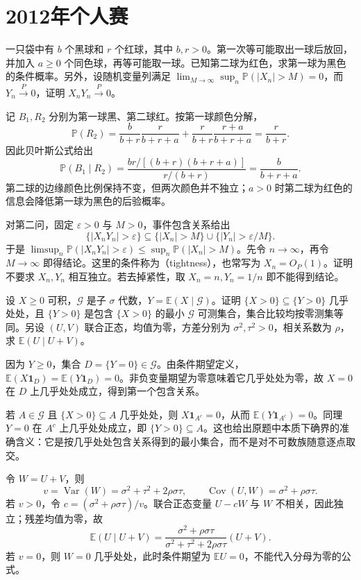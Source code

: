 \documentclass[UTF8,12pt,a4paper,fontset=fandol]{ctexbook}
\newcommand{\E}{\mathbb E}
\newcommand{\PP}{\mathbb P}
\DeclareMathOperator{\Var}{Var}
\DeclareMathOperator{\Cov}{Cov}
\begin{document}
\section{2012年个人赛}
\begin{example}[原题1：强化抽样与随机乘积]\label{yau:2012-1}
一只袋中有 $b$ 个黑球和 $r$ 个红球，其中 $b,r>0$。第一次等可能取出一球后放回，并加入 $a\ge0$ 个同色球，再等可能取一球。已知第二球为红色，求第一球为黑色的条件概率。另外，设随机变量列满足 $\lim_{M\to\infty}\sup_n\PP(|X_n|>M)=0$，而 $Y_n\xrightarrow{P}0$，证明 $X_nY_n\xrightarrow{P}0$。
\end{example}
\begin{solve}
记 $B_1,R_2$ 分别为第一球黑、第二球红。按第一球颜色分解，
\[
\PP(R_2)=\frac b{b+r}\frac r{b+r+a}+\frac r{b+r}\frac{r+a}{b+r+a}=\frac r{b+r}.
\]
因此贝叶斯公式给出
\[
\PP(B_1\mid R_2)=\frac{br/[(b+r)(b+r+a)]}{r/(b+r)}=\frac b{b+r+a}.
\]
第二球的边缘颜色比例保持不变，但两次颜色并不独立；$a>0$ 时第二球为红色的信息会降低第一球为黑色的后验概率。

对第二问，固定 $\varepsilon>0$ 与 $M>0$，事件包含关系给出
\[
\{|X_nY_n|>\varepsilon\}\subseteq\{|X_n|>M\}\cup\{|Y_n|>\varepsilon/M\}.
\]
于是 $\limsup_n\PP(|X_nY_n|>\varepsilon)\le\sup_n\PP(|X_n|>M)$。先令 $n\to\infty$，再令 $M\to\infty$ 即得结论。这里的条件称为（tightness），也常写为 $X_n=O_P(1)$。证明不要求 $X_n,Y_n$ 相互独立。若去掉紧性，取 $X_n=n,Y_n=1/n$ 即不能得到结论。
\end{solve}

\begin{example}[原题2：条件期望的正值集合与正态投影]\label{yau:2012-2}
设 $X\ge0$ 可积，$\mathcal G$ 是子 $\sigma$ 代数，$Y=\E(X\mid\mathcal G)$。证明 $\{X>0\}\subseteq\{Y>0\}$ 几乎处处，且 $\{Y>0\}$ 是包含 $\{X>0\}$ 的最小 $\mathcal G$ 可测集合，集合比较均按零测集等同。另设 $(U,V)$ 联合正态，均值为零，方差分别为 $\sigma^2,\tau^2>0$，相关系数为 $\rho$，求 $\E(U\mid U+V)$。
\end{example}
\begin{solve}
因为 $Y\ge0$，集合 $D=\{Y=0\}\in\mathcal G$。由条件期望定义，$\E(X\mathbf1_D)=\E(Y\mathbf1_D)=0$。非负变量期望为零意味着它几乎处处为零，故 $X=0$ 在 $D$ 上几乎处处成立，得到第一个包含关系。

若 $A\in\mathcal G$ 且 $\{X>0\}\subseteq A$ 几乎处处，则 $X\mathbf1_{A^c}=0$，从而 $\E(Y\mathbf1_{A^c})=0$。同理 $Y=0$ 在 $A^c$ 上几乎处处成立，即 $\{Y>0\}\subseteq A$。这也给出原题中本质下确界的准确含义：它是按几乎处处包含关系得到的最小集合，而不是对不可数族随意逐点取交。

令 $W=U+V$，则
\[
v=\Var(W)=\sigma^2+\tau^2+2\rho\sigma\tau,\qquad \Cov(U,W)=\sigma^2+\rho\sigma\tau.
\]
若 $v>0$，令 $c=(\sigma^2+\rho\sigma\tau)/v$。联合正态变量 $U-cW$ 与 $W$ 不相关，因此独立；残差均值为零，故
\[
\E(U\mid U+V)=\frac{\sigma^2+\rho\sigma\tau}{\sigma^2+\tau^2+2\rho\sigma\tau}(U+V).
\]
若 $v=0$，则 $W=0$ 几乎处处，此时条件期望为 $\E U=0$，不能代入分母为零的公式。
\end{solve}
\end{document}
